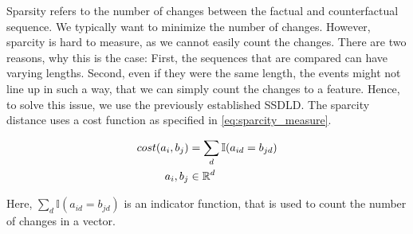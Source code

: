 \documentclass[./../../paper.tex]{subfiles}
\begin{document}
Sparsity refers to the number of changes between the factual and counterfactual sequence. We typically want to minimize the number of changes. However, sparcity is hard to measure, as we cannot easily count the changes. There are two reasons, why this is the case: First, the sequences that are compared can have varying lengths. Second, even if they were the same length, the events might not line up in such a way, that we can simply count the changes to a feature. Hence, to solve this issue, we use the previously established \gls{SSDLD}. The sparcity distance uses a cost function as specified in \autoref{eq:sparcity_measure}.

\begin{align}
    \label{eq:sparcity_measure}                          
    cost(a_i, b_j)      & = \sum_d \mathbb{I}(a_{id} = b_{jd})  \\ 
    a_i,b_j        & \in \mathbb{R}^d \nonumber 
\end{align}

\noindent Here, $\sum_d \mathbb{I}(a_{id} = b_{jd})$ is an indicator function, that is used to count the number of changes in a vector. 





        


        
        

        
\end{document}
